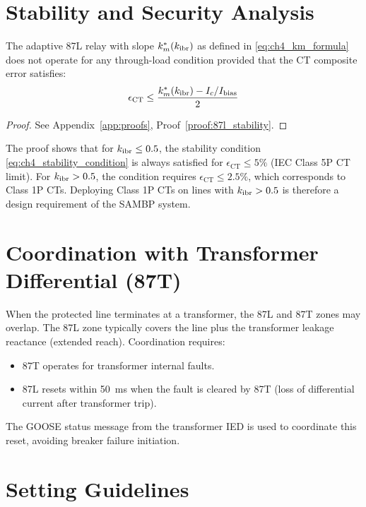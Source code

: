 \section{Stability and Security Analysis}
\label{sec:ch4_stability}

\begin{proposition}
\label{prop:ch4_stability}
The adaptive 87L relay with slope $k_m^\ast(k_\mathrm{ibr})$ as defined in
\eqref{eq:ch4_km_formula} does not operate for any through-load condition
provided that the CT composite error satisfies:
\begin{equation}
  \epsilon_\mathrm{CT} \leq \frac{k_m^\ast(k_\mathrm{ibr}) - I_c/I_\mathrm{bias}}{2}
  \label{eq:ch4_stability_condition}
\end{equation}
\end{proposition}

\begin{proof}
See Appendix~\ref{app:proofs}, Proof~\ref{proof:87l_stability}.
\end{proof}

The proof shows that for $k_\mathrm{ibr} \leq 0.5$, the stability condition
\eqref{eq:ch4_stability_condition} is always satisfied for
$\epsilon_\mathrm{CT} \leq 5\%$ (IEC Class 5P CT limit). For
$k_\mathrm{ibr} > 0.5$, the condition requires $\epsilon_\mathrm{CT} \leq 2.5\%$,
which corresponds to Class 1P CTs. Deploying Class 1P CTs on lines with
$k_\mathrm{ibr} > 0.5$ is therefore a design requirement of the SAMBP system.

\section{Coordination with Transformer Differential (87T)}
\label{sec:ch4_87t_coord}

When the protected line terminates at a transformer, the 87L and 87T zones
may overlap. The 87L zone typically covers the line plus the transformer
leakage reactance (extended reach). Coordination requires:
\begin{itemize}
\item 87T operates for transformer internal faults.
\item 87L resets within 50~ms when the fault is cleared by 87T
  (loss of differential current after transformer trip).
\end{itemize}
The GOOSE status message from the transformer IED is used to coordinate
this reset, avoiding breaker failure initiation.

\section{Setting Guidelines}
\label{sec:ch4_settings}

